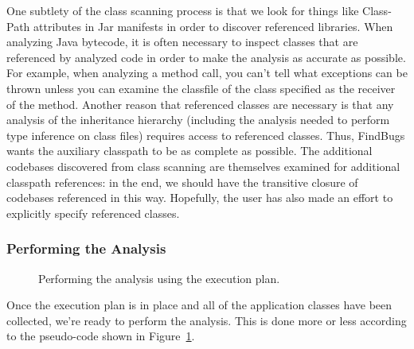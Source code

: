 \documentclass[11pt]{article}
\newcommand{\Indent}{\hskip .25in}
\begin{document}
One subtlety of the class scanning process is that we look for things like
Class-Path attributes in Jar manifests in order to discover referenced
libraries.  When analyzing Java bytecode, it is often necessary to inspect
classes that are referenced by analyzed code in order to make the analysis
as accurate as possible.  For example, when analyzing a method call,
you can't tell what exceptions can be thrown unless you can examine the
classfile of the class specified as the receiver of the method.  Another reason
that referenced classes are necessary is that any analysis of the inheritance
hierarchy (including the analysis needed to perform type inference on
class files) requires access to referenced classes.  Thus, FindBugs wants
the auxiliary classpath to be as complete as possible.  The additional codebases
discovered from class scanning are themselves examined for additional classpath
references: in the end, we should have the transitive closure of codebases
referenced in this way.  Hopefully, the user has also made an effort to
explicitly specify referenced classes.

\subsubsection{Performing the Analysis}

\begin{figure}
\caption{Performing the analysis using the execution plan.}\label{fig:performingTheAnalysis}
\end{figure}

Once the execution plan is in place and all of the application classes have been collected,
we're ready to perform the analysis.  This is done more or less according to the
pseudo-code shown in Figure~\ref{fig:performingTheAnalysis}.
\end{document}
